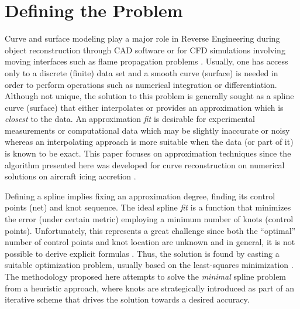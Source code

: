 \documentclass[a4paper,12pt]{article}
\author{Julia Docampo}
\begin{document}
 
 
 \section{Defining the Problem}
 Curve and surface modeling play a major role in Reverse Engineering during object reconstruction
  through CAD software \cite{Ma1998, sarkar1991} or for CFD simulations involving moving
  interfaces such as flame propagation problems \cite{malladi1995}. 
  Usually, one has access only to a discrete (finite) data set 
  and a smooth curve (surface) is needed in order to perform operations such as numerical integration or differentiation. 
  Although not unique, the solution to this problem is generally sought as a spline curve (surface)  
  that either interpolates or provides an approximation which is \emph{closest} to the data.  
   An approximation \emph{fit} is desirable for experimental measurements or computational data 
   which may be slightly inaccurate or noisy whereas an interpolating approach \cite{piegl1999,ma1995} 
   is more suitable when
   the data (or part of it) is known to be exact. This paper focuses on 
   approximation techniques since the algorithm presented here was developed for 
    curve reconstruction on numerical solutions on aircraft icing accretion \cite{}. 
    
    Defining a spline implies fixing an approximation degree, 
    finding its control points (net) and knot sequence.  The ideal spline \emph{fit} is a function 
     that minimizes the error (under certain metric) employing a minimum number 
     of knots (control points).  Unfortunately, this represents a great challenge since both the ``optimal'' number of control points 
  and knot location are unknown and in general, it is not possible to derive explicit formulas \cite{jupp1978}.  
  Thus, the solution is found by casting a suitable optimization problem, 
  usually based on the least-squares minimization \cite{nurbs_book, deboor2001practical, schumaker2015spline}. 
   The methodology proposed here attempts to solve the \emph{minimal} spline problem 
   from a heuristic approach, where knots are strategically introduced 
   as part of an iterative scheme that drives the solution towards a desired accuracy. 
      
\end{document}
